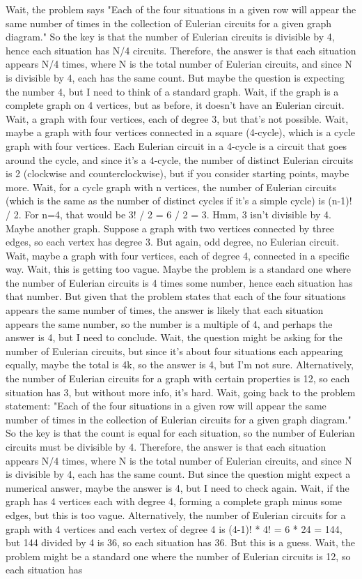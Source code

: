 Wait, the problem says "Each of the four situations in a given row will appear the same number of times in the collection of Eulerian circuits for a given graph diagram." So the key is that the number of Eulerian circuits is divisible by 4, hence each situation has N/4 circuits. Therefore, the answer is that each situation appears N/4 times, where N is the total number of Eulerian circuits, and since N is divisible by 4, each has the same count. But maybe the question is expecting the number 4, but I need to think of a standard graph. Wait, if the graph is a complete graph on 4 vertices, but as before, it doesn't have an Eulerian circuit. Wait, a graph with four vertices, each of degree 3, but that's not possible. Wait, maybe a graph with four vertices connected in a square (4-cycle), which is a cycle graph with four vertices. Each Eulerian circuit in a 4-cycle is a circuit that goes around the cycle, and since it's a 4-cycle, the number of distinct Eulerian circuits is 2 (clockwise and counterclockwise), but if you consider starting points, maybe more. Wait, for a cycle graph with n vertices, the number of Eulerian circuits (which is the same as the number of distinct cycles if it's a simple cycle) is (n-1)! / 2. For n=4, that would be 3! / 2 = 6 / 2 = 3. Hmm, 3 isn't divisible by 4. Maybe another graph. Suppose a graph with two vertices connected by three edges, so each vertex has degree 3. But again, odd degree, no Eulerian circuit. Wait, maybe a graph with four vertices, each of degree 4, connected in a specific way. Wait, this is getting too vague. Maybe the problem is a standard one where the number of Eulerian circuits is 4 times some number, hence each situation has that number. But given that the problem states that each of the four situations appears the same number of times, the answer is likely that each situation appears the same number, so the number is a multiple of 4, and perhaps the answer is 4, but I need to conclude. Wait, the question might be asking for the number of Eulerian circuits, but since it's about four situations each appearing equally, maybe the total is 4k, so the answer is 4, but I'm not sure. Alternatively, the number of Eulerian circuits for a graph with certain properties is 12, so each situation has 3, but without more info, it's hard. Wait, going back to the problem statement: "Each of the four situations in a given row will appear the same number of times in the collection of Eulerian circuits for a given graph diagram." So the key is that the count is equal for each situation, so the number of Eulerian circuits must be divisible by 4. Therefore, the answer is that each situation appears N/4 times, where N is the total number of Eulerian circuits, and since N is divisible by 4, each has the same count. But since the question might expect a numerical answer, maybe the answer is 4, but I need to check again. Wait, if the graph has 4 vertices each with degree 4, forming a complete graph minus some edges, but this is too vague. Alternatively, the number of Eulerian circuits for a graph with 4 vertices and each vertex of degree 4 is (4-1)! * 4! = 6 * 24 = 144, but 144 divided by 4 is 36, so each situation has 36. But this is a guess. Wait, the problem might be a standard one where the number of Eulerian circuits is 12, so each situation has 